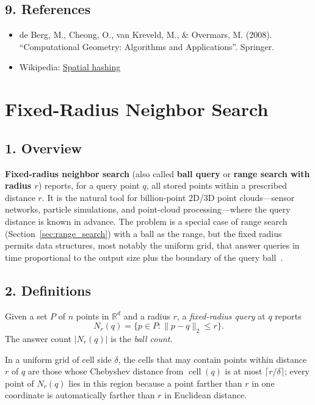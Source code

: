 \subsection{9. References}
\begin{itemize}
    \item de Berg, M., Cheong, O., van Kreveld, M., \& Overmars, M. (2008). ``Computational Geometry: Algorithms and Applications''. Springer.
    \item Wikipedia: \href{https://en.wikipedia.org/wiki/Spatial_hashing}{Spatial hashing}
\end{itemize}

\section{Fixed-Radius Neighbor Search}
\label{sec:fixed_radius_search}

\subsection{1. Overview}
\textbf{Fixed-radius neighbor search}
(also called \textbf{ball query} or \textbf{range search with radius $r$})
reports, for a query point $q$, all stored points within a prescribed distance
$r$. It is the natural tool for billion-point 2D/3D point clouds---sensor
networks, particle simulations, and point-cloud processing---where the query
distance is known in advance. The problem is a special case of range search
(Section~\ref{sec:range_search}) with a ball as the range, but the fixed
radius permits data structures, most notably the uniform grid, that answer
queries in time proportional to the output size plus the boundary of the query
ball~\cite{berg2008}.

\subsection{2. Definitions}

\begin{definition}\label{def:fixed_radius_query}
Given a set $P$ of $n$ points in $\mathbb{R}^d$ and a radius $r$, a
\emph{fixed-radius query} at $q$ reports
\[
N_r(q) = \{p \in P : \|p - q\|_2 \le r\}.
\]
The answer count $|N_r(q)|$ is the \emph{ball count}.
\end{definition}

\begin{definition}\label{def:grid_search_region}
In a uniform grid of cell side $\delta$, the cells that may contain points
within distance $r$ of $q$ are those whose Chebyshev distance from
$\operatorname{cell}(q)$ is at most $\lceil r/\delta \rceil$; every point of
$N_r(q)$ lies in this region because a point farther than $r$ in one
coordinate is automatically farther than $r$ in Euclidean distance.
\end{definition}

